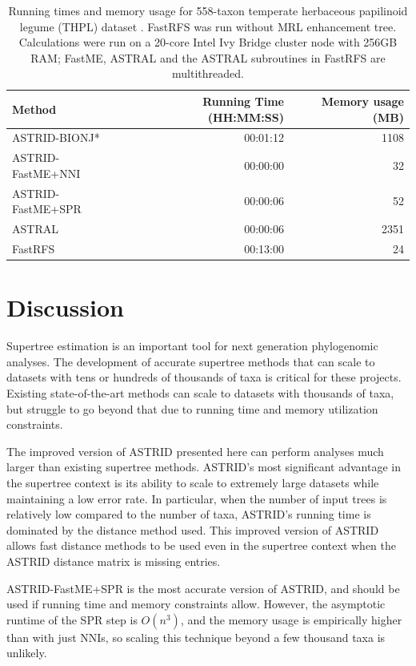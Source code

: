 \begin{table}[hbt!]
    \centering
\begin{tabular}{l|rr}
     Method & Running Time  (HH:MM:SS) & Memory usage (MB)\\
    \hline
     ASTRID-BIONJ* & 00:01:12 & 1108 \\
     ASTRID-FastME+NNI & 00:00:00 & 32 \\
     ASTRID-FastME+SPR & 00:00:06 & 52 \\
     ASTRAL & 00:00:06 & 2351 \\
     FastRFS & 00:13:00 & 24 \\
\end{tabular}
\caption[Running times and memory usage for 558-taxon temperate herbaceous papilinoid legume (THPL) dataset]{Running times and memory usage for 558-taxon temperate herbaceous papilinoid legume (THPL) dataset \cite{cpl}. FastRFS was run without MRL enhancement tree. Calculations were run on a 20-core Intel Ivy Bridge cluster node with 256GB RAM; FastME, ASTRAL and the ASTRAL subroutines in FastRFS are multithreaded.}
\label{astrid-missing::tab:thpl-runningtime}
\end{table}

\section{Discussion}

Supertree estimation is an important tool for next generation phylogenomic analyses. The development of accurate supertree methods that can scale to datasets with tens or hundreds of thousands of taxa is critical for these projects. Existing state-of-the-art methods can scale to datasets with thousands of taxa, but struggle to go beyond that due to running time and memory utilization constraints. 

The improved version of ASTRID presented here can perform analyses much larger than existing supertree methods. ASTRID's most significant advantage in the supertree context is its ability to scale to extremely large datasets while maintaining a low error rate. In particular, when the number of input trees is relatively low compared to the number of taxa, ASTRID's running time is dominated by the distance method used. This improved version of ASTRID allows fast distance methods to be used even in the supertree context when the ASTRID distance matrix is missing entries.

ASTRID-FastME+SPR is the most accurate version of ASTRID, and should be used if running time and memory constraints allow. However, the asymptotic runtime of the SPR step is $O(n^3)$, and the memory usage is empirically higher than with just NNIs, so scaling this technique beyond a few thousand taxa is unlikely.

